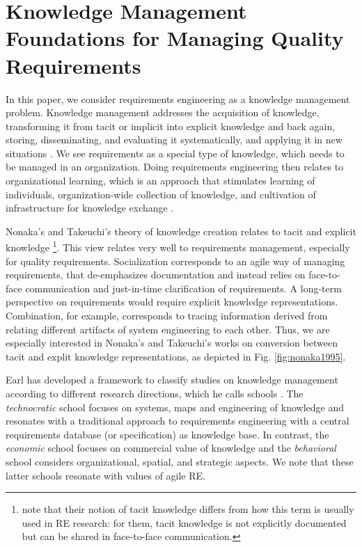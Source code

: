 \section{Knowledge Management Foundations for Managing Quality Requirements}

In this paper, we consider requirements engineering as a knowledge management problem. 
Knowledge management addresses the acquisition of knowledge, transforming it from tacit or implicit into explicit knowledge and back again, storing, disseminating, and evaluating it systematically, and applying it in new situations \cite{Schneider2009}.
We see requirements as a special type of knowledge, which needs to be managed in an organization.
Doing requirements engineering then relates to organizational learning, which is an approach that stimulates learning of individuals, organization-wide collection of knowledge, and cultivation of infrastructure for knowledge exchange \cite{Schneider2009}.




Nonaka's and Takeuchi's theory of knowledge creation relates to tacit and explicit knowledge \cite{Nonaka1995}\footnote{note that their notion of tacit knowledge differs from how this term is usually used in RE research: for them, tacit knowledge is not explicitly documented but can be shared in face-to-face communication.}.  
%
This view relates very well to requirements management, especially for quality requirements. 
Socialization corresponds to an agile way of managing requirements, that de-emphasizes documentation and instead relies on face-to-face communication and just-in-time clarification of requirements. 
A long-term perspective on requirements would require explicit knowledge representations.
Combination, for example, corresponds to tracing information derived from relating different artifacts of system engineering to each other. 
Thus, we are especially interested in Nonaka's and Takeuchi's works on conversion between tacit and explit knowledge representations, as depicted in Fig. \ref{fig:nonaka1995}.

Earl has developed a framework to classify studies on knowledge management according to different research directions, which he calls schools \cite{Earl2001}.
The \emph{technocratic} school focuses on systems, maps and engineering of knowledge and resonates with a traditional approach to requirements engineering with a central requirements database (or specification) as knowledge base. 
In contrast, the \emph{economic} school focuses on commercial value of knowledge and the \emph{behavioral} school considers organizational, spatial, and strategic aspects.
We note that these latter schools resonate with values of agile RE.